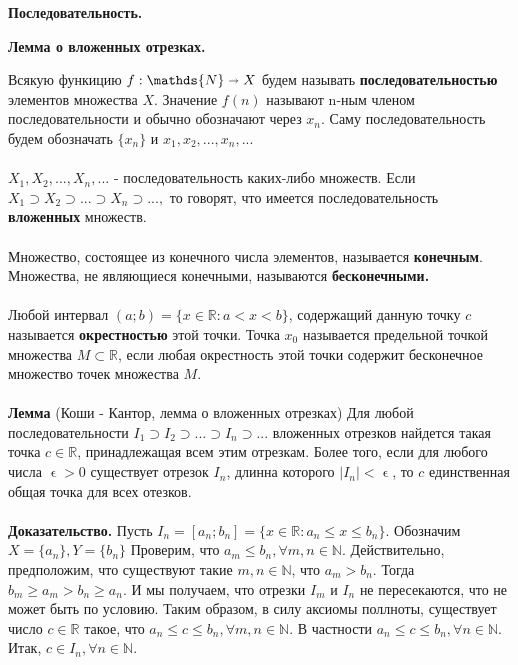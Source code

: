 \documentclass[12pt]{article}
\begin{document}
\begin{center}
    \large\textbf{Последовательность.}
\end{center}
\begin{center}
    \large\textbf{Лемма о вложенных отрезках.}
\end{center}
 \indent Всякую функицию $f:\mathds{N}\shortrightarrow X$ будем называть \textbf{последовательностью} элементов множества $X$. Значение $f(n)$ называют n-ным членом последовательности и обычно обозначают через $x_{n}$. Саму последовательность будем обозначать $\{x_{n}\}$ и $x_{1}, x_{2},..., x_{n}, ...$\\\\
     $X_{1}, X_{2},..., X_{n},...$  { }{ }{ }{ }{ }{ }- { } { }{ }{ }
 последовательность каких-либо множеств. Если $X_{1}\supset X_{2}\supset... \supset X_{n}\supset...,$ то говорят, что имеется последовательность \textbf{вложенных} множеств.\\\\
\noindent Множество, состоящее из конечного числа элементов, называется \textbf{конечным}. Множества, не являющиеся конечными, называются \textbf{бесконечными.}\\\\
\noindent Любой интервал $(a;b) = \{x\in \mathds{R}: a < x < b\}$, содержащий данную точку $c$ называется \textbf{окрестностью} этой точки. Точка $x_{0}$ называется предельной точкой множества $M \subset \mathds{R}$, если любая окрестность этой точки содержит бесконечное множество точек множества $M$. \\\\
\textbf{Лемма} (Коши - Кантор, лемма о вложенных отрезках) Для любой последовательности $I_{1}\supset I_{2}\supset... \supset I_{n}\supset...$ вложенных отрезков найдется такая точка $c \in \mathds{ R }$, принадлежащая всем этим отрезкам. Более того, если для любого числа $\upvarepsilon > 0$ существует отрезок $I_{n}$, длинна которого $|I_{n}| < \upvarepsilon$, то $c$ единственная общая точка для всех отезков.\\\\
\indent \textbf{Доказательство.} Пусть $I_{n}=[ a_{n} ; b_{n} ]=\{x \in \mathds R: a_{n}\leqslant x\leqslant b_{n}\}$. Обозначим $X = \{a_{n}\}, Y=\{b_{n}\}$ Проверим, что $a_{m} \leqslant b_{n},\forall m,n \in \mathds N.$ Действительно, предположим, что существуют такие $m,n \in \mathds N$, что $a_{m} > b_{n}$. Тогда $b_{m} \geqslant a_{m} > b_{n} \geqslant a_{n}$. И мы получаем, что отрезки $I_{m} $ и $I_{n}$ не пересекаются, что не может быть по условию. Таким образом, в силу аксиомы поллноты, существует число $c \in \mathds R$ такое, что $a_{n} \leqslant c \leqslant b_{n}, \forall m, n \in \mathds N$. В частности $a_{n} \leqslant c \leqslant b_{n}, \forall n \in \mathds N$. Итак, $ c \in I_{n}, \forall n \in \mathds N$. \\\\
\end{document}
